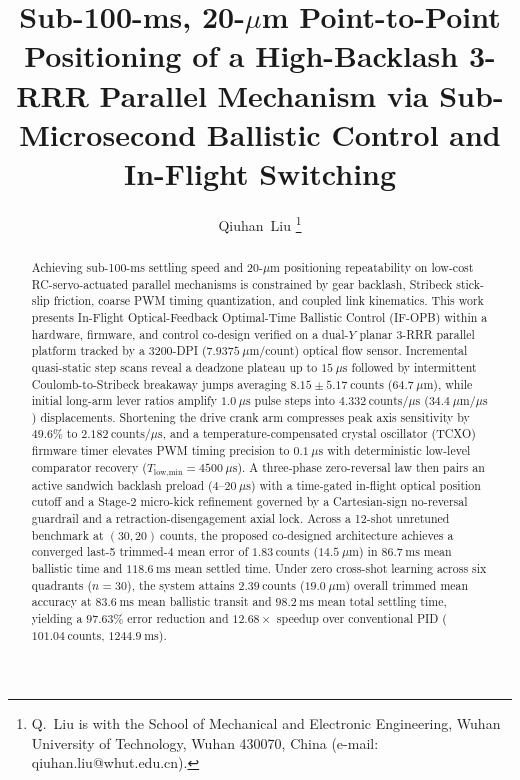 \documentclass[journal]{IEEEtran}
\begin{document}
\title{Sub-100-ms, 20-$\mu$m Point-to-Point Positioning of a High-Backlash 3-RRR Parallel Mechanism via Sub-Microsecond Ballistic Control and In-Flight Switching}

\author{Qiuhan~Liu%
\thanks{Q.~Liu is with the School of Mechanical and Electronic Engineering, Wuhan University of Technology, Wuhan 430070, China (e-mail: qiuhan.liu@whut.edu.cn).}}

\maketitle

\begin{abstract}
Achieving sub-100-ms settling speed and 20-$\mu$m positioning repeatability on low-cost RC-servo-actuated parallel mechanisms is constrained by gear backlash, Stribeck stick-slip friction, coarse PWM timing quantization, and coupled link kinematics. This work presents In-Flight Optical-Feedback Optimal-Time Ballistic Control (IF-OPB) within a hardware, firmware, and control co-design verified on a dual-$Y$ planar 3-RRR parallel platform tracked by a 3200-DPI ($7.9375\ \mu\text{m}/\text{count}$) optical flow sensor. Incremental quasi-static step scans reveal a deadzone plateau up to $15\ \mu\text{s}$ followed by intermittent Coulomb-to-Stribeck breakaway jumps averaging $8.15 \pm 5.17\ \text{counts}$ ($64.7\ \mu\text{m}$), while initial long-arm lever ratios amplify $1.0\ \mu\text{s}$ pulse steps into $4.332\ \text{counts}/\mu\text{s}$ ($34.4\ \mu\text{m}/\mu\text{s}$) displacements. Shortening the drive crank arm compresses peak axis sensitivity by $49.6\%$ to $2.182\ \text{counts}/\mu\text{s}$, and a temperature-compensated crystal oscillator (TCXO) firmware timer elevates PWM timing precision to $0.1\ \mu\text{s}$ with deterministic low-level comparator recovery ($T_{\text{low,min}} = 4500\ \mu\text{s}$). A three-phase zero-reversal law then pairs an active sandwich backlash preload ($4\text{--}20\ \mu\text{s}$) with a time-gated in-flight optical position cutoff and a Stage-2 micro-kick refinement governed by a Cartesian-sign no-reversal guardrail and a retraction-disengagement axial lock. Across a 12-shot unretuned benchmark at $(30, 20)\ \text{counts}$, the proposed co-designed architecture achieves a converged last-5 trimmed-4 mean error of $1.83\ \text{counts}$ ($14.5\ \mu\text{m}$) in $86.7\ \text{ms}$ mean ballistic time and $118.6\ \text{ms}$ mean settled time. Under zero cross-shot learning across six quadrants ($n = 30$), the system attains $2.39\ \text{counts}$ ($19.0\ \mu\text{m}$) overall trimmed mean accuracy at $83.6\ \text{ms}$ mean ballistic transit and $98.2\ \text{ms}$ mean total settling time, yielding a $97.63\%$ error reduction and $12.68\times$ speedup over conventional PID ($101.04\ \text{counts}$, $1244.9\ \text{ms}$).
\end{abstract}
\end{document}
